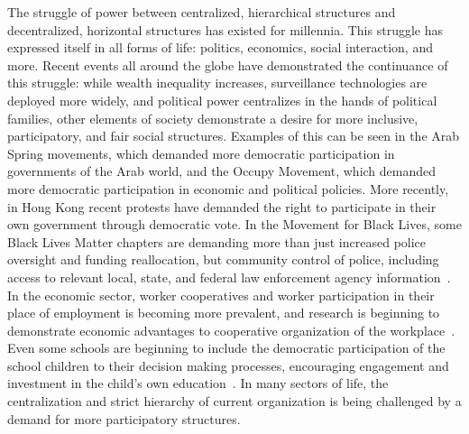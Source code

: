 The struggle of power between centralized, hierarchical structures and
decentralized, horizontal structures has existed for millennia. This struggle
has expressed itself in all forms of life: politics, economics, social
interaction, and more. Recent events all around the globe have demonstrated the
continuance of this struggle: while wealth inequality increases, surveillance
technologies are deployed more widely, and political power centralizes in the
hands of political families, other elements of society demonstrate a desire for
more inclusive, participatory, and fair social structures. Examples of this can
be seen in the Arab Spring movements, which demanded more democratic
participation in governments of the Arab world, and the Occupy Movement, which
demanded more democratic participation in economic and political policies. More
recently, in Hong Kong recent protests have demanded the right to participate in
their own government through democratic vote. In the Movement for Black Lives,
some Black Lives Matter chapters are demanding more than just increased police
oversight and funding reallocation, but community control of police, including
access to relevant local, state, and federal law enforcement agency
information~\cite{m4bl2021}. In the economic sector, worker cooperatives and
worker participation in their place of employment is becoming more prevalent,
and research is beginning to demonstrate economic advantages to cooperative
organization of the
workplace~\cite{jackall19846,wright2014worker, lindenfeld1982workplace}.
Even some schools are beginning to include the democratic participation of the
school children to their decision making processes, encouraging engagement and
investment in the child's own education~\cite{pacheco2008escola}. In many
sectors of life, the centralization and strict hierarchy of current organization
is being challenged by a demand for more participatory structures.

